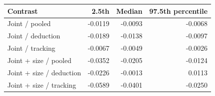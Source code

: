 \begin{tabular}{lrrr}
\toprule
Contrast & 2.5th & Median & 97.5th percentile\\
\midrule
Joint / pooled & -0.0119 & -0.0093 & -0.0068\\
Joint / deduction & -0.0189 & -0.0138 & -0.0097\\
Joint / tracking & -0.0067 & -0.0049 & -0.0026\\
Joint + size / pooled & -0.0352 & -0.0205 & -0.0124\\
Joint + size / deduction & -0.0226 & -0.0013 & 0.0113\\
Joint + size / tracking & -0.0589 & -0.0401 & -0.0250\\
\bottomrule
\end{tabular}

